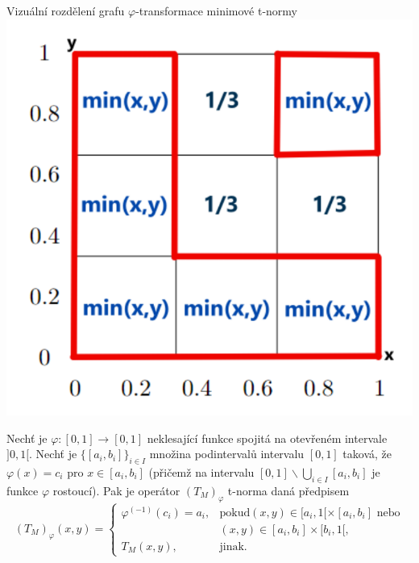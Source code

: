     
\begin{graph}Vizu\' aln\' i rozd\v elen\'i grafu $\varphi$-transformace minimov\' e t-normy\\
\tikzset{>=stealth}
\centering
\includegraphics[scale=0.8]{template-fig/phi-tnorm.pdf}
\end{graph}

    

\begin{sentence}
\cite{smutna}
\label{t-norm}
 Nech\v t je $\varphi:[0,1]\rightarrow [0,1]$
neklesající funkce spojitá na otevřeném intervale $]0,1[$.
Nech\v t je $\{[a_i,b_i]\}_{i\in I}$ množina podinterval\r u
intervalu $[0,1]$ taková, že $\varphi(x)=c_i$ pro $x\in
[a_i,b_i]$ (přičemž na intervalu $[0,1]\backslash \bigcup \limits_{i \in I}
[a_i,b_i]$ je funkce $\varphi$
rostoucí).
Pak je operátor $(T_M)_{\varphi}$  t-norma daná předpisem
$$ (T_M)_{\varphi}(x,y) = \begin{cases} \varphi^{(-1)}(c_i)=a_i, &\mbox {pokud
$(x,y)\in [a_i,1[\times[a_i,b_i]$ nebo}
\\ & (x,y)\in [a_i,b_i]\times[b_i,1[,
\\ T_M(x,y), &\mbox {jinak.}
\end{cases} $$
\end{sentence}

